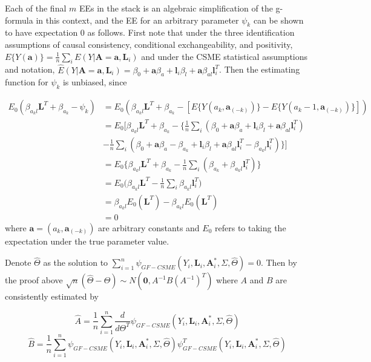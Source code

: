 \documentclass[12pt]{article}
\begin{document}
Each of the final $m$ EEs in the stack is an algebraic simplification of the g-formula in this context, and the EE for an arbitrary parameter $\psi_{k}$ can be shown to have expectation 0 as follows. First note that under the three identification assumptions of causal consistency, conditional exchangeability, and positivity, $E\{ Y(\bm{a}) \} = \frac{1}{n}\sum_{i} E(Y | \bm{A} = \bm{a}, \bm{L}_{i})$ and under the CSME statistical assumptions and notation, $\hat{E}(Y | \bm{A} = \bm{a}, \bm{L}_{i}) = \beta_{0} + \bm{a}\beta_{a} + \bm{l}_{i}\beta_{l} + \bm{a}\beta_{al}\bm{l}_{i}^{T}$. Then the estimating function for $\psi_{k}$ is unbiased, since

\begin{align*}
E_{0}(\beta_{a_{k}l}\bm{L}^{T} + \beta_{a_{k}} - \psi_{k}) &= E_{0}(\beta_{a_{k}l}\bm{L}^{T} + \beta_{a_{k}} - [E\{ Y(a_{k}, \bm{a}_{(-k)})\} - E\{ Y(a_{k} - 1, \bm{a}_{(-k)})\} ]) \\
&=E_{0}\bigg[ \beta_{a_{k}l}\bm{L}^{T} + \beta_{a_{k}} - \bigg \{ \frac{1}{n} \sum_{i} (\beta_{0} + \bm{a}\beta_{a} + \bm{l}_{i}\beta_{l} + \bm{a}\beta_{al}\bm{l}_{i}^{T}) \\
&- \frac{1}{n} \sum_{i} (\beta_{0} + \bm{a}\beta_{a} - \beta_{a_{k}} + \bm{l}_{i}\beta_{l} + \bm{a}\beta_{al}\bm{l}_{i}^{T} - \beta_{a_{k}l}\bm{l}_{i}^{T}) \bigg \} \bigg] \\
&=E_{0} \bigg \{ \beta_{a_{k}l}\bm{L}^{T} + \beta_{a_{k}} - \frac{1}{n}\sum_{i} (\beta_{a_{k}} + \beta_{a_{k}l}\bm{l}_{i}^{T}) \bigg \} \\
&=E_{0} \bigg( \beta_{a_{k}l}\bm{L}^{T} - \frac{1}{n}\sum_{i}\beta_{a_{k}l}\bm{l}_{i}^{T} \bigg) \\
&=\beta_{a_{k}l}E_{0}(\bm{L}^{T}) - \beta_{a_{k}l}E_{0}(\bm{L}^{T}) \\
&=0
\end{align*}
where $\bm{a} = (a_{k}, \bm{a}_{(-k)})$ are arbitrary constants and $E_{0}$ refers to taking the expectation under the true parameter value.

Denote $\hat{\Theta}$ as the solution to $\sum_{i=1}^{n} \psi_{GF-CSME}(Y_{i}, \bm{L}_{i}, \bm{A}^{*}_{i}, \Sigma, \hat{\Theta}) = 0$. Then by the proof above $\sqrt{n}(\hat{\Theta} - \Theta) \sim N(\textbf{0}, A^{-1}B(A^{-1})^{T})$ where $A$ and $B$ are consistently estimated by

\begin{equation*}
\hat{A} = \frac{1}{n} \sum_{i=1}^{n} \frac{d}{d\Theta^{T}} \psi_{GF-CSME}(Y_{i}, \bm{L}_{i}, \bm{A}^{*}_{i}, \Sigma, \hat{\Theta})
\end{equation*}
\begin{equation*}
\hat{B} = \frac{1}{n} \sum_{i=1}^{n} \psi_{GF-CSME}(Y_{i}, \bm{L}_{i}, \bm{A}^{*}_{i}, \Sigma, \hat{\Theta}) \psi^{T}_{GF-CSME}(Y_{i}, \bm{L}_{i}, \bm{A}^{*}_{i}, \Sigma, \hat{\Theta})
\end{equation*}
\end{document}
